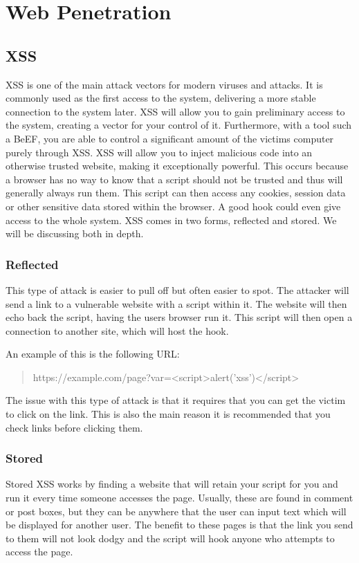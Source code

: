 \chapter{Web Penetration}
	\label{ch:WebPenetration}
	\section{XSS}
		XSS is one of the main attack vectors for modern viruses and attacks. 
		It is commonly used as the first access to the system, delivering a more stable connection to the system later. 
		XSS will allow you to gain preliminary access to the system, creating a vector for your control of it. 
		Furthermore, with a tool such a BeEF, you are able to control a significant amount of the victims computer purely through XSS. 
		XSS will allow you to inject malicious code into an otherwise trusted website, making it exceptionally powerful. 
		This occurs because a browser has no way to know that a script should not be trusted and thus will generally always run them. 
		This script can then access any cookies, session data or other sensitive data stored within the browser. 
		A good hook could even give access to the whole system. 
		XSS comes in two forms, reflected and stored. 
		We will be discussing both in depth. 
		\subsection{Reflected}
			This type of attack is easier to pull off but often easier to spot. 
			The attacker will send a link to a vulnerable website with a script within it. 
			The website will then echo back the script, having the users browser run it. 
			This script will then open a connection to another site, which will host the hook. 

			An example of this is the following URL:
			\begin{quote}
				https://example.com/page?var=<script>alert('xss')</script>
			\end{quote}

			The issue with this type of attack is that it requires that you can get the victim to click on the link.
			This is also the main reason it is recommended that you check links before clicking them.
		\subsection{Stored}
			Stored XSS works by finding a website that will retain your script for you and run it every time someone accesses the page. 
			Usually, these are found in comment or post boxes, but they can be anywhere that the user can input text which will be displayed for another user. 
			The benefit to these pages is that the link you send to them will not look dodgy and the script will hook anyone who attempts to access the page. 
